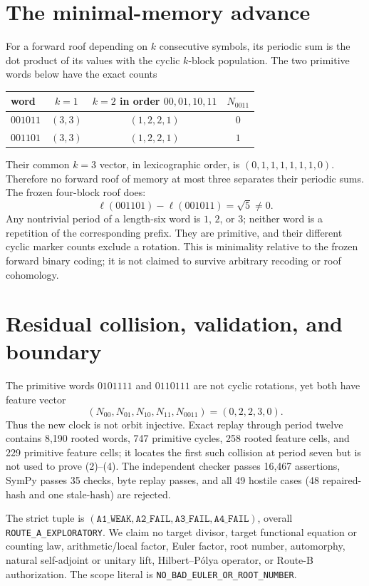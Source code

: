 \documentclass[10pt]{article}
\begin{document}
\section{The minimal-memory advance}
For a forward roof depending on $k$ consecutive symbols, its periodic sum is
the dot product of its values with the cyclic $k$-block population.  The two
primitive words below have the exact counts
\begin{center}
\begin{tabular}{@{}lccc@{}}
\toprule
word & $k=1$ & $k=2$ in order $00,01,10,11$ & $N_{0011}$\\
\midrule
$001011$ & $(3,3)$ & $(1,2,2,1)$ & $0$\\
$001101$ & $(3,3)$ & $(1,2,2,1)$ & $1$\\
\bottomrule
\end{tabular}
\end{center}
Their common $k=3$ vector, in lexicographic order, is
$(0,1,1,1,1,1,1,0)$.  Therefore no forward roof of memory at most three
separates their periodic sums.  The frozen four-block roof does:
\[
\ell(001101)-\ell(001011)=\sqrt5\ne0.             \tag{5}
\]
Any nontrivial period of a length-six word is $1$, $2$, or $3$; neither word
is a repetition of the corresponding prefix.  They are primitive, and their
different cyclic marker counts exclude a rotation.  This is minimality
relative to the frozen forward binary coding; it is not claimed to survive
arbitrary recoding or roof cohomology.

\section{Residual collision, validation, and boundary}
The primitive words $0101111$ and $0110111$ are not cyclic rotations, yet both
have feature vector
\[
(N_{00},N_{01},N_{10},N_{11},N_{0011})=(0,2,2,3,0).
\]
Thus the new clock is not orbit injective.  Exact replay through period twelve
contains 8,190 rooted words, 747 primitive cycles, 258 rooted feature cells,
and 229 primitive feature cells; it locates the first such collision at period
seven but is not used to prove (2)--(4).  The independent checker passes
16,467 assertions, SymPy passes 35 checks, byte replay passes, and all 49
hostile cases (48 repaired-hash and one stale-hash) are rejected.

The strict tuple is $(\texttt{A1\_WEAK},\texttt{A2\_FAIL},
\texttt{A3\_FAIL},\texttt{A4\_FAIL})$, overall
\texttt{ROUTE\_A\_EXPLORATORY}.  We claim no target divisor, target functional
equation or counting law, arithmetic/local factor, Euler factor, root number,
automorphy, natural self-adjoint or unitary lift, Hilbert--P\'olya operator, or
Route-B authorization.  The scope literal is
\texttt{NO\_BAD\_EULER\_OR\_ROOT\_NUMBER}.
\end{document}
